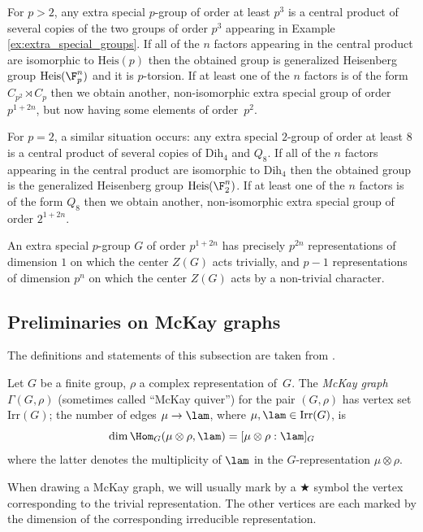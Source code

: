 For $p>2$, any extra special $p$-group of order at least $p^3$ is a central 
product of several copies of the two groups of order $p^3$ appearing in Example 
\ref{ex:extra_special_groups}. If all of the $n$ factors appearing in the 
central product are isomorphic to $\mathrm{Heis}(p)$ then the obtained group is 
generalized Heisenberg group $\mathrm{Heis}(\F_p^n)$ and it is $p$-torsion. If at least 
one of the $n$ factors is of the form $C_{p^2} \rtimes C_p$ then we obtain 
another, non-isomorphic extra special group of order $p^{1+2n}$, but now having 
some elements of order~$p^2$.

For $p=2$, a similar situation occurs: any extra special $2$-group of order at 
least $8$ is a central product of several copies of $\mathrm{Dih}_4$ and $Q_8$. If 
all of the $n$ factors appearing in the central product are isomorphic to 
$\mathrm{Dih}_4$ then the obtained group is the generalized Heisenberg group 
$\mathrm{Heis}(\F_2^n)$. If at least one of the $n$ factors is of the form $Q_8$ then we 
obtain another, non-isomorphic extra special group of order $2^{1+2n}$.

An extra special $p$-group $G$ of order $p^{1+2n}$ has precisely $p^{2n}$ 
representations of dimension $1$ on which the center $Z(G)$ acts trivially, and 
$p-1$ representations of dimension $p^n$ on which the center $Z(G)$ acts by a 
non-trivial character.

\subsection{Preliminaries on McKay graphs}
The definitions and statements of this subsection are taken from \cite{McKay}.
\begin{defi}
Let $G$ be a finite group, $\rho$ a complex representation of~$G$. The 
{\it McKay graph} $\Gamma(G, \rho)$ (sometimes called ``McKay quiver'') for the 
pair $(G, \rho)$ has vertex set $\mathrm{Irr}(G)$; the number of edges $\mu \to \lam$, 
where $\mu,\lam \in \mathrm{Irr}(G)$, is 
$$\dim \Hom_G(\mu \otimes \rho,\lam) = [\mu\otimes \rho:\lam]_G$$ where the 
latter denotes the multiplicity of $\lam$ in the $G$-representation $\mu\otimes 
\rho$.
\end{defi}
When drawing a McKay graph, we will usually mark by a $\bigstar$ symbol the vertex corresponding to the trivial representation. The other vertices are each marked by the dimension of the corresponding irreducible representation. 

